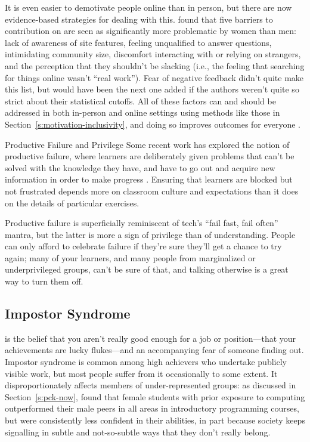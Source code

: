 It is even easier to demotivate people online than in person, but
there are now evidence-based strategies for dealing with this.
\cite{Ford2016} found that five barriers to contribution on  are seen as significantly more problematic
by women than men: lack of awareness of site features, feeling
unqualified to answer questions, intimidating community size,
discomfort interacting with or relying on strangers, and the
perception that they shouldn't be slacking (i.e., the feeling that
searching for things online wasn't ``real work''). Fear of negative
feedback didn't quite make this list, but would have been the next one
added if the authors weren't quite so strict about their statistical
cutoffs. All of these factors can and should be addressed in both
in-person and online settings using methods like those in
Section~\ref{s:motivation-inclusivity}, and doing so improves outcomes
for everyone \cite{Sved2016}.

\begin{aside}{Productive Failure and Privilege}
  Some recent work has explored the notion of productive failure, where
  learners are deliberately given problems that can't be solved with the
  knowledge they have, and have to go out and acquire new information in
  order to make progress \cite{Kapu2016}. Ensuring that learners are
  blocked but not frustrated depends more on classroom culture and
  expectations than it does on the details of particular exercises.

  Productive failure is superficially reminiscent of tech's ``fail fast,
  fail often'' mantra, but the latter is more a sign of privilege than of
  understanding. People can only afford to celebrate failure if they're
  sure they'll get a chance to try again; many of your learners, and
  many people from marginalized or underprivileged groups, can't be sure
  of that, and talking otherwise is a great way to turn them off.
\end{aside}

\subsection{Impostor Syndrome}\label{s:motivation-impostor-syndrome}

 is the belief that
you aren't really good enough for a job or position---that your
achievements are lucky flukes---and an accompanying fear of someone
finding out. Impostor syndrome is common among high achievers who
undertake publicly visible work, but most people suffer from it
occasionally to some extent. It disproportionately affects members of
under-represented groups: as discussed in Section~\ref{s:pck-now},
\cite{Wilc2018} found that female students with prior exposure to
computing outperformed their male peers in all areas in introductory
programming courses, but were consistently less confident in their
abilities, in part because society keeps signalling in subtle and
not-so-subtle ways that they don't really belong.

